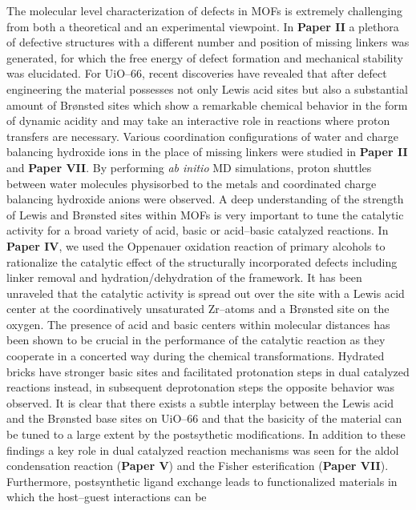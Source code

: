 \npar
The molecular level characterization of defects in MOFs is extremely challenging
from both a theoretical and an experimental viewpoint. In \textbf{Paper II} a
plethora of defective structures with a different number and position of missing linkers
was generated, for which the free energy of defect formation and mechanical
stability was elucidated.
\npar
For UiO--66, recent discoveries have revealed that after defect engineering the
material possesses not only Lewis acid sites but also a substantial amount of
Br\o{}nsted sites which show a remarkable chemical behavior in the form of
dynamic acidity and may take an interactive role in reactions where proton
transfers are necessary. Various coordination configurations of water and charge balancing hydroxide ions in the place of missing linkers were studied in \textbf{Paper II} and \textbf{Paper VII}. By performing \textit{ab initio} MD simulations, proton shuttles between water molecules physisorbed to the metals and coordinated charge balancing hydroxide anions were observed.
\npar
A deep understanding of the strength of Lewis and Br\o{}nsted sites within MOFs
is very important to tune the catalytic activity for a broad variety of acid,
basic or acid--basic catalyzed reactions. In \textbf{Paper IV}, we used the
Oppenauer oxidation reaction of primary alcohols to rationalize the catalytic
effect of the structurally incorporated defects including linker removal and
hydration/dehydration of the framework. It has been unraveled that the catalytic
activity is spread out over the  site with a Lewis acid center at
the coordinatively unsaturated Zr--atoms and a Br\o{}nsted site on the oxygen.
The presence of acid and basic centers within molecular distances has been shown to be crucial in the performance of the catalytic reaction as they cooperate in a concerted way during the chemical transformations. Hydrated bricks have stronger basic sites and facilitated protonation steps in dual catalyzed reactions instead, in subsequent deprotonation steps the opposite behavior was observed.
It is clear that there exists a subtle interplay between the Lewis acid and the
Br\o{}nsted base sites on UiO--66 and that the basicity of the material can be
tuned to a large extent by the postsythetic modifications.
\npar
In addition to these findings a key role in dual catalyzed reaction mechanisms
was seen for the aldol condensation reaction (\textbf{Paper V}) and the Fisher
esterification (\textbf{Paper VII}). Furthermore, postsynthetic ligand exchange
leads to functionalized materials in which the host--guest interactions can be
